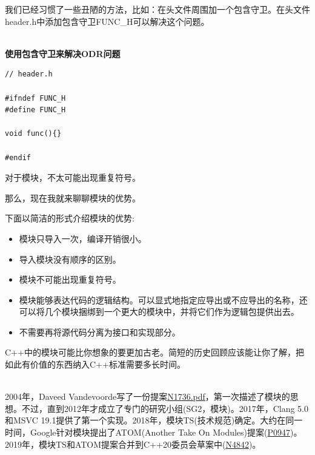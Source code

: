 我们已经习惯了一些丑陋的方法，比如：在头文件周围加一个包含守卫。在头文件header.h中添加包含守卫FUNC\_H可以解决这个问题。

\hspace*{\fill} \\ %
\noindent
\textbf{使用包含守卫来解决ODR问题}
\begin{lstlisting}[style=styleCXX]
// header.h

#ifndef FUNC_H
#define FUNC_H

void func(){}

#endif
\end{lstlisting}

对于模块，不太可能出现重复符号。

那么，现在我就来聊聊模块的优势。


下面以简洁的形式介绍模块的优势:

\begin{itemize}
\item 
模块只导入一次，编译开销很小。

\item 
导入模块没有顺序的区别。

\item 
模块不可能出现重复符号。

\item 
模块能够表达代码的逻辑结构。可以显式地指定应导出或不应导出的名称，还可以将几个模块捆绑到一个更大的模块中，并将它们作为逻辑包提供出去。

\item 
不需要再将源代码分离为接口和实现部分。
\end{itemize}

\begin{tcolorbox}[breakable,enhanced jigsaw,colback=blue!5!white,colframe=blue!75!black,title={常规类型}]

C++中的模块可能比你想象的要更加古老。简短的历史回顾应该能让你了解，把如此有价值的东西纳入C++标准需要多长时间。

\hspace*{\fill} \\ %
2004年，Daveed Vandevoorde写了一份提案\href{http://www.open-std.org/jtc1/sc22/wg21/docs/papers/2004/n1736.pdf}{N1736.pdf}，第一次描述了模块的思想。不过，直到2012年才成立了专门的研究小组(SG2，模块)。2017年，Clang 5.0和MSVC 19.1提供了第一个实现。2018年，模块TS(技术规范)确定。大约在同一时间，Google针对模块提出了ATOM(Another Take On Modules)提案(\href{http://www.open-std.org/jtc1/sc22/wg21/docs/papers/2018/p0947r1.html}{P0947})。2019年，模块TS和ATOM提案合并到C++20委员会草案中(\href{https://github.com/cplusplus/draft/releases/tag/n4842}{N4842})。
\end{tcolorbox}


